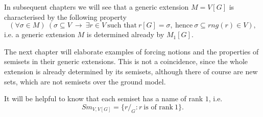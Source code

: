 In subsequent chapters we will see that a generic extension $M=V[G]$ is characterised by the following property
$$
(\forall \sigma \in M) \ ( \sigma \subseteq V \ \rightarrow \
	\exists r \in V \ \mbox{such that} \ r[G] = \sigma, \ \mbox{hence} \ \sigma \subseteq rng(r) \in V),
$$
i.e. a generic extension $M$ is determined already by $M_1[G]$.

The next chapter will elaborate examples of forcing notions and the properties
of semisets in their generic extensions. This is not a coincidence, since
the whole extension is already determined by its semisets, although there of course
are new sets, which are not semisets over the ground model.

It will be helpful to know that each semiset has a name of rank $1$, i.e.
$$
Sm_{V,V[G]}=\{r/_G:r\ \mbox{is of rank}\ 1\}.
$$



